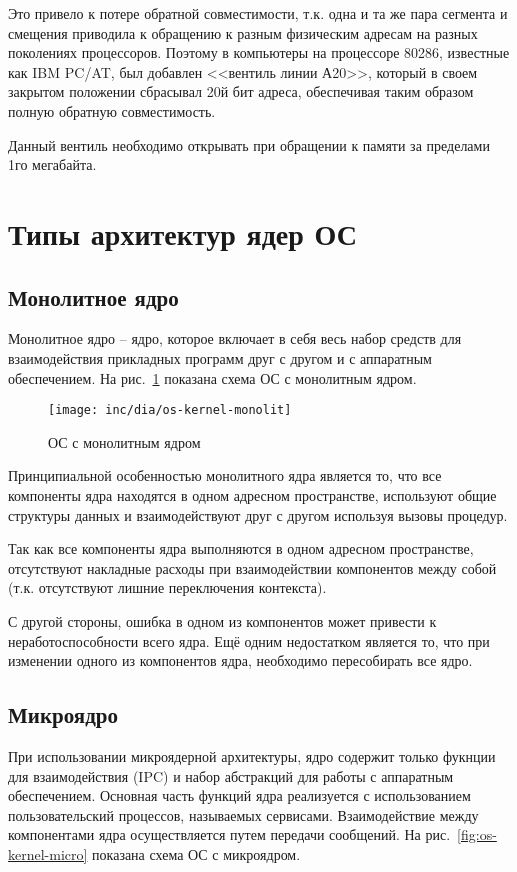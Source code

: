 Это привело к потере обратной совместимости, т.к. одна и та же пара сегмента и смещения приводила
к обращению к разным физическим адресам на разных поколениях процессоров. Поэтому в компьютеры на
процессоре 80286, известные как IBM PC/AT, был добавлен <<вентиль линии А20>>, который в своем
закрытом положении сбрасывал 20й бит адреса, обеспечивая таким образом полную обратную совместимость.

Данный вентиль необходимо открывать при обращении к памяти за пределами 1го мегабайта.


\section{Типы архитектур ядер ОС}
\subsection{Монолитное ядро}
Монолитное ядро -- ядро, которое включает в себя весь набор средств для
взаимодействия прикладных программ друг с другом и с аппаратным обеспечением.
На рис.~\ref{fig:os-kernel-monolit} показана схема ОС с монолитным ядром.

\begin{figure}[ht!]
  \centering
  \texttt{[image: inc/dia/os-kernel-monolit]}
  \caption{ОС с монолитным ядром}
  \label{fig:os-kernel-monolit}
\end{figure}

Принципиальной особенностью монолитного ядра является то, что все компоненты
ядра находятся в одном адресном пространстве, используют общие структуры
данных и взаимодействуют друг с другом используя вызовы процедур.

Так как все компоненты ядра выполняются в одном адресном пространстве,
отсутствуют накладные расходы при взаимодействии компонентов между собой (т.к.
отсутствуют лишние переключения контекста).

С другой стороны, ошибка в одном из компонентов может привести к
неработоспособности всего ядра. Ещё одним недостатком является то,
что при изменении одного из компонентов ядра, необходимо
пересобирать все ядро.

\subsection{Микроядро}
При использовании микроядерной архитектуры, ядро содержит только фукнции для
взаимодействия (IPC) и набор абстракций для работы с аппаратным обеспечением.
Основная часть функций ядра реализуется с использованием пользовательский
процессов, называемых сервисами. Взаимодействие между компонентами ядра
осуществляется путем передачи сообщений. На рис.~\ref{fig:os-kernel-micro} показана
схема ОС с микроядром.

